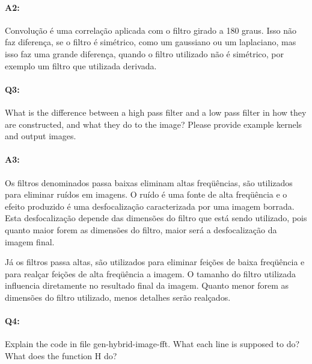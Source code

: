 \paragraph{A2:} Convolução é  uma correlação aplicada com o filtro girado a 180 graus. Isso não faz diferença, se o filtro é simétrico, como um gaussiano ou um laplaciano, mas isso faz uma grande diferença, quando o filtro utilizado não é simétrico, por exemplo um filtro que utilizada derivada.





\pagebreak
\paragraph{Q3:} What is the difference between a high pass filter and a low pass filter in how they are constructed, and what they do to the image? Please provide example kernels and output images.

\paragraph{A3:}

Os filtros denominados passa baixas eliminam altas freqüências, são utilizados para eliminar ruídos em imagens. O ruído é uma fonte de alta freqüência e o efeito produzido é uma desfocalização caracterizada por uma imagem borrada. Esta desfocalização depende das dimensões do filtro que está sendo utilizado, pois quanto maior forem as dimensões do filtro, maior será a desfocalização da imagem final. 

Já os filtros passa altas, são utilizados para eliminar feições de baixa freqüência e para realçar feições de alta freqüência a imagem. O tamanho do filtro utilizada influencia diretamente no resultado final da imagem. Quanto menor forem as dimensões do filtro utilizado, menos detalhes serão realçados.





\pagebreak
\paragraph{Q4:} Explain the code in file gen-hybrid-image-fft. What each line is supposed to do? What does the function H do?


